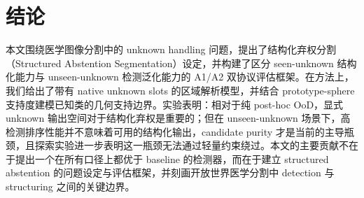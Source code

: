 \documentclass[3p,twocolumn,authoryear]{elsarticle}
\begin{document}
\section{结论}\label{sec:conclusion}
本文围绕医学图像分割中的 unknown handling 问题，提出了结构化弃权分割（Structured Abstention Segmentation）设定，并构建了区分 seen-unknown 结构化能力与 unseen-unknown 检测泛化能力的 A1/A2 双协议评估框架。在方法上，我们给出了带有 native unknown slots 的区域解析模型，并结合 prototype-sphere 支持度建模已知类的几何支持边界。实验表明：相对于纯 post-hoc OoD，显式 unknown 输出空间对于结构化弃权是重要的；但在 unseen-unknown 场景下，高检测排序性能并不意味着可用的结构化输出，candidate purity 才是当前的主导瓶颈，且探索实验进一步表明这一瓶颈无法通过轻量约束绕过。本文的主要贡献不在于提出一个在所有口径上都优于 baseline 的检测器，而在于建立 structured abstention 的问题设定与评估框架，并刻画开放世界医学分割中 detection 与 structuring 之间的关键边界。



\end{document}

